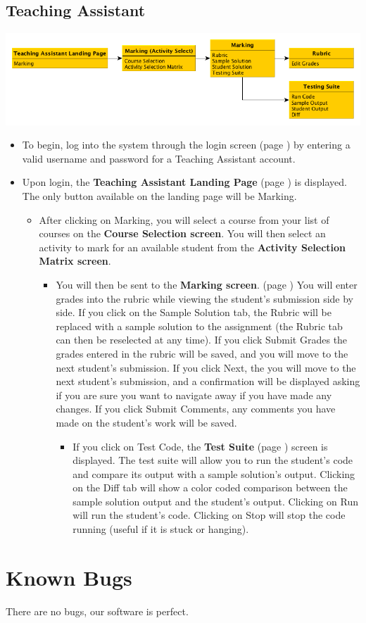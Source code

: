 \documentclass{article}
\begin{document}
\subsection{Teaching Assistant}
\centerline{\includegraphics[scale=.6]{../images/UIMockups/pngs/teachingAsst}}
\begin{itemize}
  \item To begin, log into the system through the login screen (page \pageref{login})
    by entering a valid username and password for a Teaching Assistant account.
  \item Upon login, the \textbf{Teaching Assistant Landing Page} (page \pageref{landPg}) 
  	is displayed. The only button available on the landing page will be Marking.
    \begin{itemize}
      \item After clicking on Marking, you will select a course from your list of courses
	on the \textbf{Course Selection screen}. You will then select an activity
	to mark for an available student from the \textbf{Activity Selection Matrix
	  screen}.
	\begin{itemize}
	  \item You will then be sent to the \textbf{Marking screen}. (page
	    \pageref{marking}) You will enter grades into the rubric while viewing 
	    the student's submission side by side. If you click on the Sample Solution 
	    tab, the Rubric will be replaced with a sample solution to the assignment 
	    (the Rubric tab can then be reselected at any time). If you click Submit 
	    Grades the grades entered in the rubric will be saved, and you will 
	    move to the next student's submission. If you click Next, the you will 
	    move to the next student's submission, and a confirmation will be displayed 
	    asking if you are sure you want to navigate away if you have made any 
	    changes. If you click Submit Comments, any comments you have made 
	    on the student's work will be saved.
	    \begin{itemize}
	      \item If you click on Test Code, the \textbf{Test Suite} (page 
		\pageref{testSuite}) screen is displayed. The test suite will allow you 
		to run the student's code and compare its output with a sample 
		solution's output. Clicking on the Diff tab will show a color coded 
		comparison between the sample solution output and the student's 
		output. Clicking on Run will run the student's code. Clicking on Stop 
		will stop the code running (useful if it is stuck or hanging).
	    \end{itemize}
	\end{itemize}
    \end{itemize}
\end{itemize}

\section{Known Bugs}
There are no bugs, our software is perfect.
\end{document}
